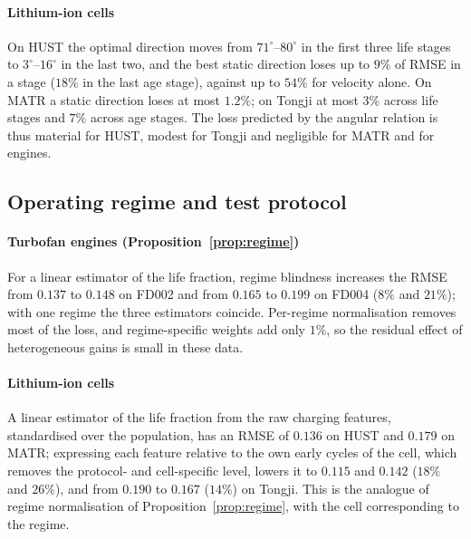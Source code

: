 \documentclass[preprint,12pt]{elsarticle}
\theoremstyle{definition}
\begin{document}
\paragraph{Lithium-ion cells} On HUST the optimal direction moves from $71^\circ$--$80^\circ$ in the first three life stages to $3^\circ$--$16^\circ$ in the last two, and the best static direction loses up to $9\%$ of RMSE in a stage ($18\%$ in the last age stage), against up to $54\%$ for velocity alone. On MATR a static direction loses at most $1.2\%$; on Tongji at most $3\%$ across life stages and $7\%$ across age stages. The loss predicted by the angular relation is thus material for HUST, modest for Tongji and negligible for MATR and for engines.

\subsection{Operating regime and test protocol}
\paragraph{Turbofan engines (Proposition~\ref{prop:regime})} For a linear estimator of the life fraction, regime blindness increases the RMSE from $0.137$ to $0.148$ on FD002 and from $0.165$ to $0.199$ on FD004 ($8\%$ and $21\%$); with one regime the three estimators coincide. Per-regime normalisation removes most of the loss, and regime-specific weights add only $1\%$, so the residual effect of heterogeneous gains is small in these data.

\paragraph{Lithium-ion cells} A linear estimator of the life fraction from the raw charging features, standardised over the population, has an RMSE of $0.136$ on HUST and $0.179$ on MATR; expressing each feature relative to the own early cycles of the cell, which removes the protocol- and cell-specific level, lowers it to $0.115$ and $0.142$ ($18\%$ and $26\%$), and from $0.190$ to $0.167$ ($14\%$) on Tongji. This is the analogue of regime normalisation of Proposition~\ref{prop:regime}, with the cell corresponding to the regime.
\end{document}
